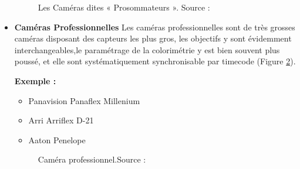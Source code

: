 \begin{itemize}
  \begin{figure}[H]%
  	\center%
  	\setlength{\fboxsep}{5pt}%
  	\setlength{\fboxrule}{0.5pt}%
  \caption[Les Caméras dites « Prosommateurs »]{Les Caméras dites « Prosommateurs ». Source :\cite{noauthor_les_2015}}
  \label{fig:Les Caméras dites « Prosommateurs »}
  \end{figure}
  
 	\item \textbf{Caméras Professionnelles} Les caméras professionnelles sont de très grosses caméras disposant des capteurs les plus gros, les objectifs y sont évidemment interchangeables,le paramétrage de la colorimétrie y est bien souvent plus poussé, et elle sont systématiquement synchronisable par timecode (Figure \ref{fig:Caméras professionnel}).
 	
 	\textbf{Exemple :}
 	
 	\begin{itemize}
 		\item Panavision Panaflex Millenium
 		\item Arri Arriflex D-21
 		\item Aaton Penelope
 	\end{itemize}
 	
 	
 	\begin{figure}[H]%
 		\center%
 		\setlength{\fboxsep}{5pt}%
 		\setlength{\fboxrule}{0.5pt}%
 	\caption[Caméras professionnel]{Caméra  professionnel.Source :\cite{noauthor_les_2015}}
 	\label{fig:Caméras professionnel}
 	\end{figure}
 	

\end{itemize}

